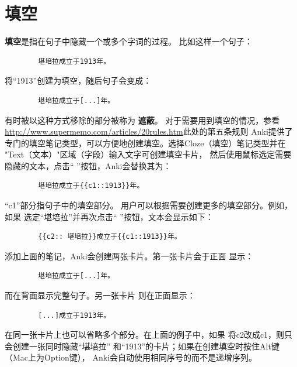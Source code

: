 \documentclass[a4paper]{book}
\begin{document}
	\section{填空}
	\textbf{填空}是指在句子中隐藏一个或多个字词的过程。 比如这样一个句子：
	\begin{shaded}\begin{verbatim}
		堪培拉成立于1913年。
		\end{verbatim}\end{shaded}
	将“1913”创建为填空，随后句子会变成：
	\begin{shaded}\begin{verbatim}
		堪培拉成立于[...]年。
		\end{verbatim}\end{shaded}
	有时被以这种方式移除的部分被称为
	\textbf{遮蔽}。
	对于需要用到填空的情况，参看\url{http://www.supermemo.com/articles/20rules.htm}此处的第五条规则
	Anki提供了专门的填空笔记类型，可以方便地创建填空。选择Cloze（填空）笔记类型并在 "Text（文本）"区域（字段）输入文字可创建填空卡片， 然后使用鼠标选定需要隐藏的文本，点击“
	”按钮，Anki会替换其为：
	\begin{shaded}\begin{verbatim}
		堪培拉成立于{{c1::1913}}年。
		\end{verbatim}\end{shaded}
	“c1”部分指句子中的填空部分。 用户可以根据需要创建更多的填空部分。例如，如果 选定“堪培拉”并再次点击“
	”按钮，文本会显示如下：
	\begin{shaded}\begin{verbatim}
		{{c2:: 堪培拉}}成立于{{c1::1913}}年。
		\end{verbatim}\end{shaded}
	添加上面的笔记，Anki会创建两张卡片。第一张卡片会于正面 显示：
	
	\begin{shaded}\begin{verbatim}
		堪培拉成立于[...]年。
		\end{verbatim}\end{shaded}
	而在背面显示完整句子。另一张卡片 则在正面显示：
	
	\begin{shaded}\begin{verbatim}
		[...]成立于1913年。
		\end{verbatim}\end{shaded}
	在同一张卡片上也可以省略多个部分。在上面的例子中，如果 将c2改成c1，则只会创建一张同时隐藏“堪培拉” 和“1913”的卡片；如果在创建填空时按住Alt键（Mac上为Option键）， Anki会自动使用相同序号的而不是递增序列。
	
\end{document}
